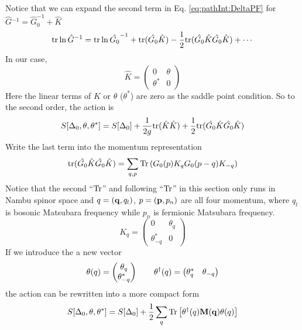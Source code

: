 Notice that we can expand the second term in Eq. \ref{eq:pathInt:DeltaPF} for $\hat{G}{}^{-1}=\hat{G}_{0}^{-1}+\hat{K}$
\begin{equation}\label{eq:pathInt:expand}
\text{tr}\ln \hat{G}^{-1}=\text{tr}\ln\hat{G_{0}}^{-1}+\text{tr}(\hat{G_{0}}\hat{K})-\frac{1}{2}\text{tr}(\hat{G_{0}}\hat{K}\hat{G_{0}}\hat{K})+\cdots
\end{equation}
In our case,
\begin{equation}
\hat{K}=\begin{pmatrix}
0&\theta\\
\theta^{*}&0
\end{pmatrix}
\end{equation}
Here the linear terms of $\hat{K}$ or $\theta$ ($\theta^{*}$) are zero as the saddle point condition.  So to the second order, the action is 
\begin{equation}\label{eq:pathInt:DeltaActionGaussian}
S[\Delta_{0},\theta,\theta^{*}]=S[\Delta_{0}]+
	\frac{1}{2g}\text{tr}(\hat{K}\hat{K})+\frac{1}{2}\text{tr}(\hat{G_{0}}\hat{K}\hat{G_{0}}\hat{K})
\end{equation}
Write the last term into the momentum representation
\begin{equation}
\text{tr}(\hat{G_{0}}\hat{K}\hat{G_{0}}\hat{K})=\sum_{q,p}\text{Tr}\left(G_{0}({p})K_{q}G_{0}{}({p-q})K_{-q}\right)
\end{equation}
Notice that the second ``$\text{Tr}$'' and following ``$\text{Tr}$'' in this section only runs in Nambu spinor space and $q={(\mathbf{q},q_{l})}$, $p=(\mathbf{p},p_{n})$ are all four momentum, where $q_{l}$ is bosonic Matsubara frequency while $p_{n}$ is fermionic Matsubara frequency.
\begin{equation}
K_{q}=\begin{pmatrix}
0&\theta_{q}\\
\theta^{*}_{-q}&0
\end{pmatrix}
\end{equation}
If we introduce the a new vector 
\begin{equation}
\theta{(q)}=\begin{pmatrix}\theta_{q}\\\theta^{*}_{-q}\end{pmatrix}\qquad
\theta^{\dagger}{(q)}=\begin{pmatrix}\theta^{*}_{q}&\theta_{-q}\end{pmatrix}
\end{equation}
the action can be rewritten into a more compact form
\begin{equation}
S[\Delta_{0},\theta,\theta^{*}]=S[\Delta_{0}]+\frac{1}{2}\sum_{q}\text{Tr}\left[\theta^{\dagger}(q)\mathbf{M(q)}\theta(q)\right]
\end{equation}
